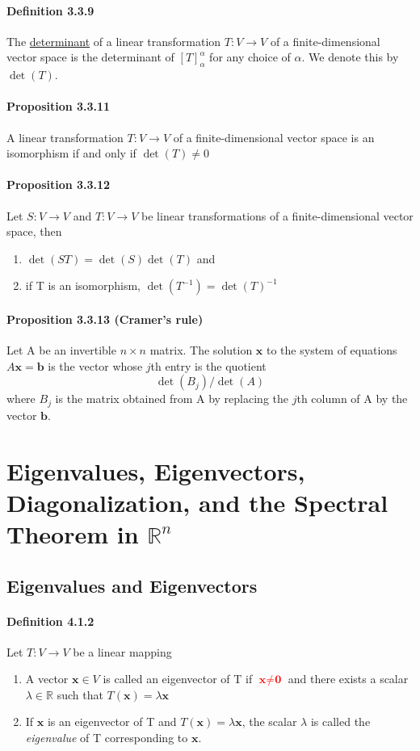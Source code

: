 \documentclass[11pt]{article}
\newcommand{\ti}[1]{\textit{#1}}
\newcommand{\tb}[1]{\textbf{#1}}
\newcommand{\under}[1]{\underline{#1}}
\newcommand{\real}[0]{\mathbb{R}}
\newcommand{\vx}[0]{\tb{x}}
\newcommand{\vo}[0]{\tb{0}}
\newcommand{\vb}[0]{\tb{b}}
\begin{document}
{\paragraph{Definition 3.3.9} The \under{determinant} of a linear transformation $T: V \rightarrow V$ of a finite-dimensional vector space is the determinant of $[T]_\alpha^\alpha$ for any choice of $\alpha$. We denote this by $\det(T)$.
\paragraph{Proposition 3.3.11} A linear transformation $T: V \rightarrow V$ of a finite-dimensional vector space is an isomorphism if and only if $\det(T) \neq 0$
\paragraph{Proposition 3.3.12} Let $S: V \rightarrow V$ and $T: V \rightarrow V$ be linear transformations of a finite-dimensional vector space, then
\begin{enumerate}
	\item $\det(ST) = \det(S)\det(T)$ and 
	\item if T is an isomorphism, $\det(T^{-1}) = \det(T)^{-1}$
\end{enumerate}
\paragraph{Proposition 3.3.13 (Cramer's rule)} Let A be an invertible $n\times n$ matrix. The solution $\vx$ to the system of equations $A\vx = \vb$ is the vector whose $j$th entry is the quotient $$\det(B_j)/\det(A)$$
where $B_j$ is the matrix obtained from A by replacing the $j$th column of A by the vector $\vb$.
\section{Eigenvalues, Eigenvectors, Diagonalization, and the Spectral Theorem in $\real^n$}
\subsection{Eigenvalues and Eigenvectors}
\paragraph{Definition 4.1.2} Let $T: V \rightarrow V$ be a linear mapping
\begin{enumerate}
	\item A vector $\vx \in V$ is called an eigenvector of T if \textcolor{red}{$\vx \neq \vo$} and there exists a scalar $\lambda \in \real$ such that $T(\vx) = \lambda\vx$
	\item If $\vx$ is an eigenvector of T and $T(\vx) = \lambda \vx$, the scalar $\lambda$ is called the \ti{eigenvalue} of T corresponding to $\vx$.
\end{enumerate}
}
\end{document}

